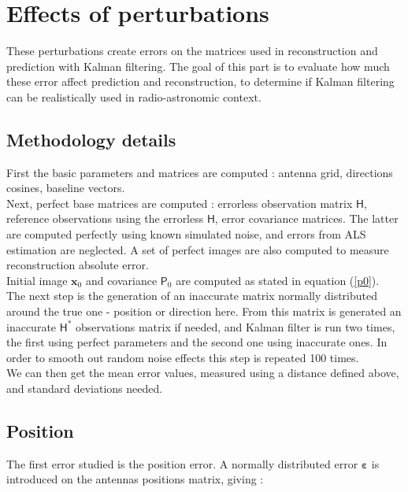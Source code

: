 \documentclass[titlepage]{article}
\renewcommand{\H}{\boldsymbol{\mathsf{H}}}
\newcommand{\x}{\boldsymbol{x}}
\renewcommand{\P}{\boldsymbol{\mathsf{P}}}
\newcommand{\vbeps}{\boldsymbol{\varepsilon}}
\begin{document}
	\section{Effects of perturbations}
	
	These perturbations create errors on the matrices used in reconstruction and prediction with Kalman filtering. The goal of this part is to evaluate how much these error affect prediction and reconstruction, to determine if Kalman filtering can be realistically used in radio-astronomic context. \\
	
	\subsection{Methodology details}

	First the basic parameters and matrices are computed : antenna grid, directions cosines, baseline vectors.\\ Next, perfect base matrices are computed : errorless observation matrix $\H$, reference observations using the errorless $\H$, error covariance matrices. The latter are computed perfectly using known simulated noise, and errors from ALS estimation are neglected. A set of perfect images are also computed to measure reconstruction absolute error.\\
	Initial image $\x_0$ and covariance $\P_0$ are computed as stated in equation (\ref{p0}).\\
	
	The next step is the generation of an inaccurate matrix normally distributed around the true one - position or direction here. From this matrix is generated an inaccurate  $\H^*$ observations matrix if needed, and Kalman filter is run two times, the first using perfect parameters and the second one using inaccurate ones. In order to smooth out random noise effects this step is repeated 100 times. \\
	
	We can then get the mean error values, measured using a distance defined above, and standard deviations needed.
	
	\subsection{Position}
	
	The first error studied is the position error. A normally distributed error $\vbeps$ is introduced on the antennas positions matrix, giving :
	
\end{document}
